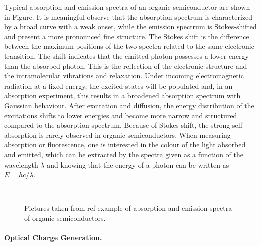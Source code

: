 \documentclass  [
  paper    = a4,
  BCOR     = 10mm,
  twoside,
  fontsize = 12pt,
  fleqn,
  toc      = bibnumbered,
  toc      = listofnumbered,
  numbers  = noendperiod,
  headings = normal,
  listof   = leveldown,
  version  = 3.03
]                                       {scrreprt}
\begin{document}
Typical absorption and emission spectra of an organic semiconductor are shown in Figure. It is meaningful observe that the absorption spectrum is characterized by a broad curve with a weak onset, while the emission spectrum is Stokes-shifted and present a more pronounced fine structure. The Stokes shift is the difference between the maximum positions of the two spectra related to the same electronic transition. The shift indicates that the emitted photon possesses a lower energy than the absorbed photon. This is the reflection of the electronic structure and the intramolecular vibrations and relaxation. Under incoming electromagnetic radiation at a fixed energy, the excited states will be populated and, in an absorption experiment, this results in a broadened absorption spectrum with Gaussian behaviour. After excitation and diffusion, the energy distribution of the excitations shifts to lower energies and become more narrow and structured compared to the absorption spectrum. Because of Stokes shift, the strong self-absorption is rarely observed in organic semiconductors. When measuring absorption or fluorescence, one is interested in the colour of the light absorbed and emitted, which can be extracted by the spectra given as a function of the wavelength $\lambda$ and knowing that the energy of a photon can be written as $E=hc/\lambda$.\\
\begin{figure}[t]
	\centering%
	\\
	\caption{\footnotesize Pictures taken from ref example of absorption and emission spectra of organic semiconductors.}
	\label{fig:frank}
\end{figure}


\paragraph{Optical Charge Generation.}
\end{document}
